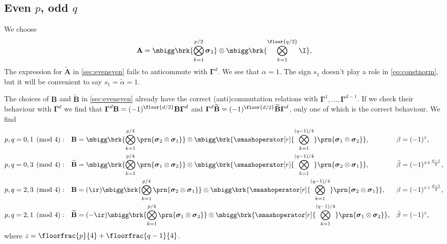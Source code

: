 \documentclass[11pt]{article}
\newcommand{\Gammab}{\boldsymbol{\Gamma}}
\newcommand{\A}{\mathbf{A}}
\newcommand{\B}{\mathbf{B}}
\newcommand{\At}{\widetilde{\A}}
\newcommand{\Bt}{\widetilde{\B}}
\newcommand{\sigmab}{\boldsymbol{\sigma}}
\newcommand{\alphat}{\tilde{\alpha}}
\newcommand{\betat}{\tilde{\beta}}
\begin{document}

\subsection{Even \texorpdfstring{\(p\)}{p}, odd \texorpdfstring{\(q\)}{q}}\label{sec:evenodd}

We choose
%
\begin{equation*}
  \A =  \mbigg\brk{\bigotimes_{k=1}^{{p/2}} \sigmab_3}
        \otimes \mbigg\brk{\bigotimes_{k=1}^{\floor{q/2}} \I},
\end{equation*}
%
The expression for \(\At\) in \cref{sec:eveneven} fails to anticommute with \(\Gammab^d\).
We see that \(\alpha = 1\).
The sign \(s_1\) doesn't play a role in \cref{eq:constnorm}, but it will be convenient to say \(s_1 = \alphat = 1\).

The choices of \(\B\) and \(\Bt\) in \cref{sec:eveneven} already have the correct (anti)commutation relations with \(\Gammab^1, \ldots, \Gammab^{d-1}\).
If we check their behaviour with \(\Gammab^d\) we find that \(\Gammab^d \B = (-1)^{\floor{d/2}}\B \Gammab^d\) and \(\Gammab^d \Bt = (-1)^{\floor{d/2}}\Bt \Gammab^d\), only one of which is the correct behaviour.
We find
%
\begin{equation*}
\begin{aligned}
  p,q &= 0,1 \pmod 4: &
  \B &= \mbigg\brk{\bigotimes_{k=1}^{p/4}
        \prn{\sigmab_2 \otimes \sigmab_1}} \otimes
        \mbigg\brk{\smashoperator[r]{\bigotimes_{k=1}^{(q-1)/4}}
        \prn{\sigmab_1 \otimes \sigmab_2}}, &
  \beta &= (-1)^{z}, \\
  p,q &= 0,3 \pmod 4: &
  \Bt &= \mbigg\brk{\bigotimes_{k=1}^{p/4}
        \prn{\sigmab_1 \otimes \sigmab_2}} \otimes
        \mbigg\brk{\smashoperator[r]{\bigotimes_{k=1}^{(q-1)/4}}
        \prn{\sigmab_2 \otimes \sigmab_1}}, &
  \betat &= (-1)^{z + \frac{d-1}{2}}, \\
  p,q &= 2,3 \pmod 4: &
  \B &= (\ir)
        \mbigg\brk{\bigotimes_{k=1}^{p/4}
        \prn{\sigmab_2 \otimes \sigmab_1}} \otimes
        \mbigg\brk{\smashoperator[r]{\bigotimes_{k=1}^{(q-1)/4}}
        \prn{\sigmab_2 \otimes \sigmab_1}}, &
  \beta &= (-1)^{z + \frac{d-1}{2}}, \\
  p,q &= 2,1 \pmod 4: &
  \Bt &= (-\ir)
        \mbigg\brk{\bigotimes_{k=1}^{p/4}
        \prn{\sigmab_1 \otimes \sigmab_2}} \otimes
        \mbigg\brk{\smashoperator[r]{\bigotimes_{k=1}^{(q-1)/4}}
        \prn{\sigmab_1 \otimes \sigmab_2}}, &
  \betat &= (-1)^{z}, 
\end{aligned}
\end{equation*}
%
where \( z = \floorfrac{p}{4} + \floorfrac{q-1}{4}\).
\end{document}
